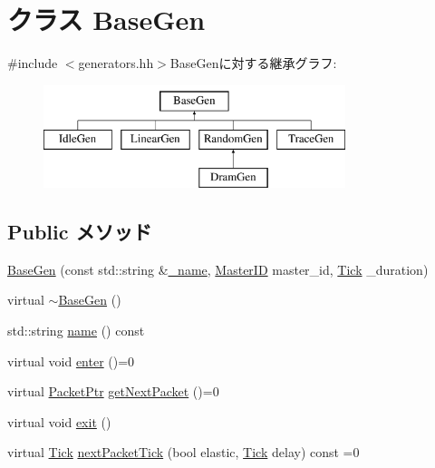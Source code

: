 \hypertarget{classBaseGen}{
\section{クラス BaseGen}
\label{classBaseGen}
}


{\ttfamily \#include $<$generators.hh$>$}BaseGenに対する継承グラフ:\begin{figure}[H]
\begin{center}
\leavevmode
\includegraphics[height=3cm]{classBaseGen}
\end{center}
\end{figure}
\subsection*{Public メソッド}
\begin{DoxyCompactItemize}
\item 
\hyperlink{classBaseGen_ac9104baf1e55a6b796dbe3d08d9b348c}{BaseGen} (const std::string \&\hyperlink{classBaseGen_a1b003dc5cfce1a4d8f9a0c4b9b589045}{\_\-name}, \hyperlink{request_8hh_ac366b729262fd8e7cbd3283da6f775cf}{MasterID} master\_\-id, \hyperlink{base_2types_8hh_a5c8ed81b7d238c9083e1037ba6d61643}{Tick} \_\-duration)
\item 
virtual \hyperlink{classBaseGen_a5b9bfeec43cf896304459480991317b4}{$\sim$BaseGen} ()
\item 
std::string \hyperlink{classBaseGen_a37627d5d5bba7f4a8690c71c2ab3cb07}{name} () const 
\item 
virtual void \hyperlink{classBaseGen_ac51895063c53dfbc0f47a01940a3aa05}{enter} ()=0
\item 
virtual \hyperlink{classPacket}{PacketPtr} \hyperlink{classBaseGen_a6cdb7c977e91dfc33aeea10a3dfcefed}{getNextPacket} ()=0
\item 
virtual void \hyperlink{classBaseGen_acbd8338aaa3340f10faecd6d2f759324}{exit} ()
\item 
virtual \hyperlink{base_2types_8hh_a5c8ed81b7d238c9083e1037ba6d61643}{Tick} \hyperlink{classBaseGen_abee7e4d35054bbc37e9332bbd17f4a69}{nextPacketTick} (bool elastic, \hyperlink{base_2types_8hh_a5c8ed81b7d238c9083e1037ba6d61643}{Tick} delay) const =0
\end{DoxyCompactItemize}

